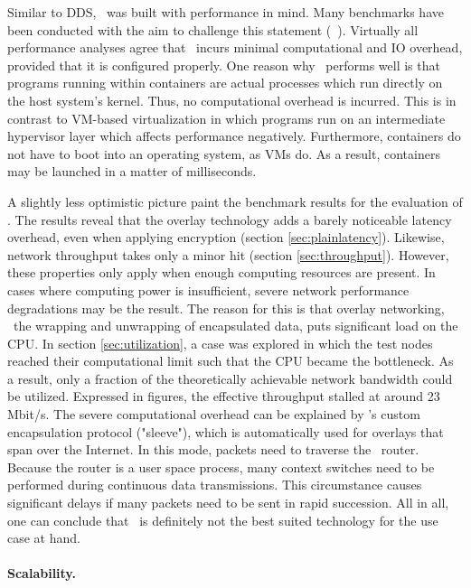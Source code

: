 Similar to DDS, \docker\ was built with performance in mind. Many benchmarks have been conducted with the aim to challenge this statement (\eg\ \cite{felter2015updated,morabito2015hypervisors}). Virtually all performance analyses agree that \docker\ incurs minimal computational and IO overhead, provided that it is configured properly. One reason why \docker\ performs well is that programs running within containers are actual processes which run directly on the host system's kernel. Thus, no computational overhead is incurred. This is in contrast to VM-based virtualization in which programs run on an intermediate hypervisor layer which affects performance negatively. Furthermore, containers do not have to boot into an operating system, as VMs do. As a result, containers may be launched in a matter of milliseconds.

A slightly less optimistic picture paint the benchmark results for the evaluation of \wnet . The results reveal that the overlay technology adds a barely noticeable latency overhead, even when applying encryption (\cf section \ref{sec:plainlatency}). Likewise, network throughput takes only a minor hit (\cf section \ref{sec:throughput}). However, these properties only apply when enough computing resources are present. In cases where computing power is insufficient, severe network performance degradations may be the result. The reason for this is that overlay networking, \ie\ the wrapping and unwrapping of encapsulated data, puts significant load on the CPU. In section \ref{sec:utilization}, a case was explored in which the test nodes reached their computational limit such that the CPU became the bottleneck. As a result, only a fraction of the theoretically achievable network bandwidth could be utilized. Expressed in figures, the effective throughput stalled at around 23 Mbit/s. The severe computational overhead can be explained by \weave 's custom encapsulation protocol ("sleeve"), which is automatically used for overlays that span over the Internet. In this mode, packets need to traverse the \weave\ router. Because the router is a user space process, many context switches need to be performed during continuous data transmissions. This circumstance causes significant delays if many packets need to be sent in rapid succession. All in all, one can conclude that \wnet\ is definitely not the best suited technology for the use case at hand.


\paragraph{Scalability.}


